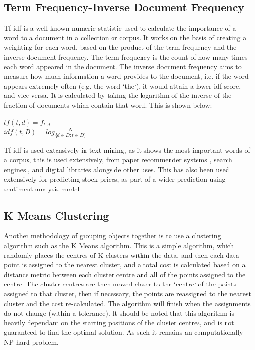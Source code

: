  \subsection{Term Frequency-Inverse Document Frequency}
 Tf-idf is a well known numeric statistic used to calculate the importance of a word to a document in a collection or corpus. It works on the basis of creating a weighting for each word, based on the product of the term frequency and the inverse document frequency. The term frequency is the count of how many times each word appeared in the document. The inverse document frequency aims to measure how much information a word provides to the document, i.e. if the word appears extremely often (e.g. the word `the`), it would attain a lower idf score, and vice versa. It is calculated by taking the logarithm of the inverse of the fraction of documents which contain that word. This is shown below:
 
 \begin{center}
 	$tf(t,d) = f_{t,d}$\\
 	$idf(t, D) = log\frac{N}{\{d \in D : t \in D\}}$
 \end{center}
 
 Tf-idf is used extensively in text mining, as it shows the most important words of a corpus, this is used extensively, from paper recommender systems \cite{beel2016paper}, search engines \cite{xu2014pos}, and digital libraries \cite{philip2014application} alongside other uses. This has also been used extensively for predicting stock prices, as part of a wider prediction using sentiment analysis model. 
 
 
\subsection{K Means Clustering}
Another methodology of grouping objects together is to use a clustering algorithm such as the K Means algorithm. This is a simple algorithm, which randomly places the centres of K clusters within the data, and then each data point is assigned to the nearest cluster, and a total cost is calculated based on a distance metric between each cluster centre and all of the points assigned to the centre. The cluster centres are then moved closer to the `centre` of the points assigned to that cluster, then if necessary, the points are reassigned to the nearest cluster and the cost re-calculated. The algorithm will finish when the assignments do not change (within a tolerance). It should be noted that this algorithm is heavily dependant on the starting positions of the cluster centres, and is not guaranteed to find the optimal solution. As such it remains an computationally NP hard problem. 

